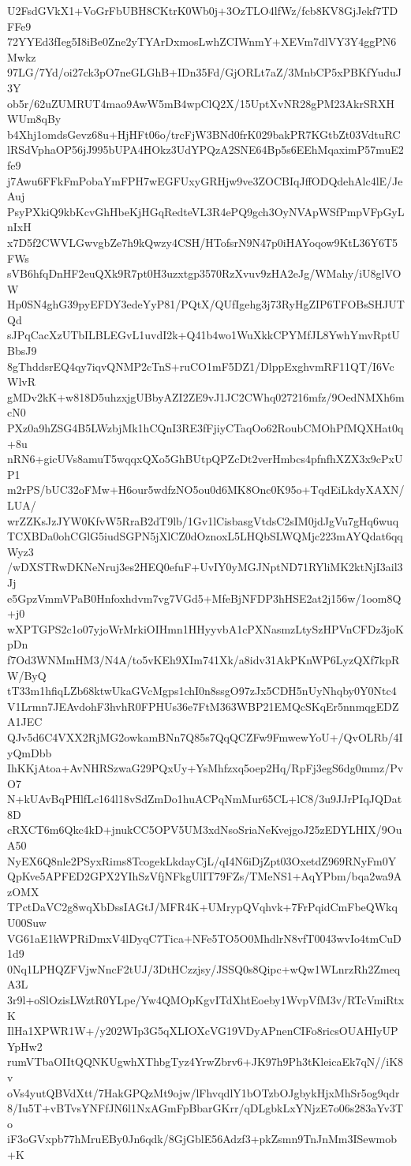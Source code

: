 U2FsdGVkX1+VoGrFbUBH8CKtrK0Wb0j+3OzTLO4lfWz/fcb8KV8GjJekf7TDFFe9
72YYEd3fIeg5I8iBe0Zne2yTYArDxmosLwhZCIWnmY+XEVm7dlVY3Y4ggPN6Mwkz
97LG/7Yd/oi27ck3pO7neGLGhB+IDn35Fd/GjORLt7aZ/3MnbCP5xPBKfYuduJ3Y
ob5r/62uZUMRUT4mao9AwW5mB4wpClQ2X/15UptXvNR28gPM23AkrSRXHWUm8qBy
b4Xhj1omdsGevz68u+HjHFt06o/trcFjW3BNd0frK029bakPR7KGtbZt03VdtuRC
lRSdVphaOP56jJ995bUPA4HOkz3UdYPQzA2SNE64Bp5s6EEhMqaximP57muE2fe9
j7Awu6FFkFmPobaYmFPH7wEGFUxyGRHjw9ve3ZOCBIqJffODQdehAlc4lE/JeAuj
PsyPXkiQ9kbKcvGhHbeKjHGqRedteVL3R4ePQ9gch3OyNVApWSfPmpVFpGyLnIxH
x7D5f2CWVLGwvgbZe7h9kQwzy4CSH/HTofsrN9N47p0iHAYoqow9KtL36Y6T5FWs
sVB6hfqDnHF2euQXk9R7pt0H3uzxtgp3570RzXvuv9zHA2eJg/WMahy/iU8glVOW
Hp0SN4ghG39pyEFDY3edeYyP81/PQtX/QUfIgehg3j73RyHgZIP6TFOBsSHJUTQd
sJPqCacXzUTbILBLEGvL1uvdI2k+Q41b4wo1WuXkkCPYMfJL8YwhYmvRptUBbsJ9
8gThddsrEQ4qy7iqvQNMP2cTnS+ruCO1mF5DZ1/DlppExghvmRF11QT/I6VcWlvR
gMDv2kK+w818D5uhzxjgUBbyAZI2ZE9vJ1JC2CWhq027216mfz/9OedNMXh6mcN0
PXz0a9hZSG4B5LWzbjMk1hCQnI3RE3fFjiyCTaqOo62RoubCMOhPfMQXHat0q+8u
nRN6+gicUVs8amuT5wqqxQXo5GhBUtpQPZcDt2verHmbcs4pfnfhXZX3x9cPxUP1
m2rPS/bUC32oFMw+H6our5wdfzNO5ou0d6MK8Onc0K95o+TqdEiLkdyXAXN/LUA/
wrZZKsJzJYW0KfvW5RraB2dT9lb/1Gv1lCisbasgVtdsC2sIM0jdJgVu7gHq6wuq
TCXBDa0ohCGlG5iudSGPN5jXlCZ0dOznoxL5LHQbSLWQMjc223mAYQdat6qqWyz3
/wDXSTRwDKNeNruj3es2HEQ0efuF+UvIY0yMGJNptND71RYliMK2ktNjI3ail3Jj
e5GpzVmmVPaB0Hnfoxhdvm7vg7VGd5+MfeBjNFDP3hHSE2at2j156w/1oom8Q+j0
wXPTGPS2c1o07yjoWrMrkiOIHmn1HHyyvbA1cPXNasmzLtySzHPVnCFDz3joKpDn
f7Od3WNMmHM3/N4A/to5vKEh9XIm741Xk/a8idv31AkPKnWP6LyzQXf7kpRW/ByQ
tT33m1hfiqLZb68ktwUkaGVcMgps1chI0n8ssgO97zJx5CDH5nUyNhqby0Y0Ntc4
V1Lrmn7JEAvdohF3hvhR0FPHUs36e7FtM363WBP21EMQcSKqEr5nnmqgEDZA1JEC
QJv5d6C4VXX2RjMG2owkamBNn7Q85s7QqQCZFw9FmwewYoU+/QvOLRb/4IyQmDbb
IhKKjAtoa+AvNHRSzwaG29PQxUy+YsMhfzxq5oep2Hq/RpFj3egS6dg0mmz/PvO7
N+kUAvBqPHlfLc164l18vSdZmDo1huACPqNmMur65CL+lC8/3u9JJrPIqJQDat8D
cRXCT6m6Qkc4kD+jnukCC5OPV5UM3xdNsoSriaNeKvejgoJ25zEDYLHIX/9OuA50
NyEX6Q8nle2PSyxRims8TcogekLkdayCjL/qI4N6iDjZpt03OxetdZ969RNyFm0Y
QpKve5APFED2GPX2YIhSzVfjNFkgUlIT79FZs/TMeNS1+AqYPbm/bqa2wa9AzOMX
TPctDaVC2g8wqXbDssIAGtJ/MFR4K+UMrypQVqhvk+7FrPqidCmFbeQWkqU00Suw
VG61aE1kWPRiDmxV4lDyqC7Tica+NFe5TO5O0MhdlrN8vfT0043wvIo4tmCuD1d9
0Nq1LPHQZFVjwNncF2tUJ/3DtHCzzjsy/JSSQ0s8Qipc+wQw1WLnrzRh2ZmeqA3L
3r9l+oSlOzisLWztR0YLpe/Yw4QMOpKgvITdXhtEoeby1WvpVfM3v/RTcVmiRtxK
IlHa1XPWR1W+/y202WIp3G5qXLIOXcVG19VDyAPnenCIFo8ricsOUAHIyUPYpHw2
rumVTbaOIItQQNKUgwhXThbgTyz4YrwZbrv6+JK97h9Ph3tKleicaEk7qN//iK8v
oVs4yutQBVdXtt/7HakGPQzMt9ojw/lFhvqdlY1bOTzbOJgbykHjxMhSr5og9qdr
8/Iu5T+vBTvsYNFfJN6l1NxAGmFpBbarGKrr/qDLgbkLxYNjzE7o06s283aYv3To
iF3oGVxpb77hMruEBy0Jn6qdk/8GjGblE56Adzf3+pkZsmn9TnJnMm3ISewmob+K
